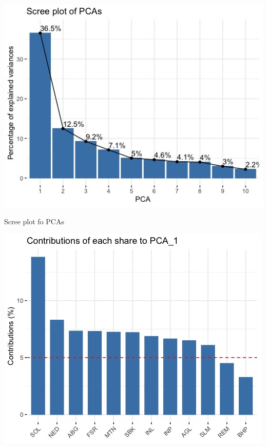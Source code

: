 \documentclass[11pt,preprint, authoryear]{elsarticle}
\let\origfigure\figure
\let\endorigfigure\endfigure
\renewenvironment{figure}[1][2] {
    \expandafter\origfigure\expandafter[H]
} {
    \endorigfigure
}
\numberwithin{equation}{section}
\numberwithin{figure}{section}
\numberwithin{table}{section}
\begin{document}
\begin{figure}[!tbp]
\centering
\begin{minipage}[b]{7cm}
\includegraphics[scale=0.45]{figures/Figure_2.jpeg}
\caption{Scree plot fo PCAs}\label{Figure_2}
\end{minipage}
\hspace{0.05cm}
\hfill
\begin{minipage}[b]{7cm}
\includegraphics[scale = 0.45]{figures/Figure_3.jpeg}
\caption{Individual contributions to PCA 1}\label{Figure_3}
\end{minipage}
\hspace{0.1cm}
\hfill
\end{figure}
\end{document}
